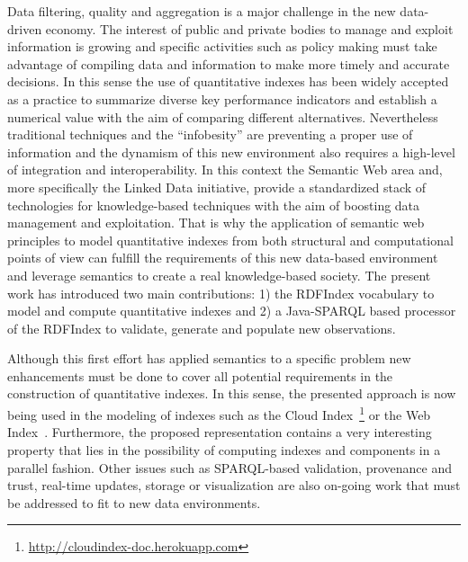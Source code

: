 Data filtering, quality and aggregation is a major challenge in the 
new data-driven economy. The interest of public and private bodies 
to manage and exploit information is growing and specific activities 
such as policy making must take advantage of compiling data and information 
to make more timely and accurate decisions. In this sense the use 
of quantitative indexes has been widely accepted as a practice to 
summarize diverse key performance indicators and establish a numerical 
value with the aim of comparing different alternatives. Nevertheless traditional techniques 
and the ``infobesity'' are preventing a proper use of information and the dynamism 
of this new environment also requires a high-level of integration and interoperability. In this 
context the Semantic Web area and, more specifically the Linked Data initiative, 
provide a standardized stack of technologies for knowledge-based techniques with 
the aim of boosting data management and exploitation. That is why the application 
of semantic web principles to model quantitative indexes from both structural and 
computational points of view can fulfill the requirements of this new data-based 
environment and leverage semantics to create a real knowledge-based society. The 
present work has introduced two main contributions: 1) the RDFIndex vocabulary to model and compute quantitative indexes and 
2) a Java-SPARQL based processor of the RDFIndex to validate, generate and populate new observations.

Although this first effort has applied semantics to a specific problem new enhancements 
must be done to cover all potential requirements in the construction of quantitative indexes. In this sense, the presented 
approach is now being used in the modeling of indexes such as the Cloud Index~\footnote{\url{http://cloudindex-doc.herokuapp.com}} or 
the Web Index~\cite{webindexlod}. Furthermore, the proposed representation contains a very interesting property 
that lies in the possibility of computing indexes and components in a parallel fashion. 
Other issues such as SPARQL-based validation, provenance and trust, real-time updates, storage or visualization are 
also on-going work that must be addressed to fit to new data environments.





